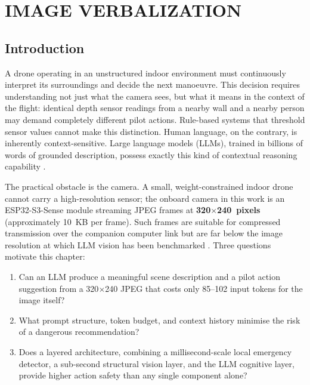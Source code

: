 \chapter{IMAGE VERBALIZATION}
\label{chap:2nd chap}

\section{Introduction}
\label{sec:ch2_intro}

A drone operating in an unstructured indoor environment must continuously interpret its surroundings and decide the next manoeuvre. 
This decision requires understanding not just what the camera
sees, but what it means in the context of the flight: identical depth sensor readings from a nearby wall and a nearby person may demand completely different pilot actions. 
Rule-based systems that threshold sensor values cannot make this distinction. 
Human language, on the contrary, is inherently context-sensitive. Large language models (LLMs), trained in billions of words of grounded description, possess exactly this kind of contextual reasoning capability \cite{vemprala2023chatgpt}.

The practical obstacle is the camera. A small, weight-constrained indoor drone cannot carry a high-resolution sensor; the onboard camera in this work is an ESP32-S3-Sense module streaming JPEG frames at \textbf{320$\times$240~pixels} (approximately 10~KB per frame). 
Such frames are suitable for compressed transmission over the companion computer link but are far below the image resolution at which LLM vision has been benchmarked \cite{achiam2023gpt4,
reid2024gemini, liu2023llava}.
\newpage
Three questions motivate this chapter:
\begin{enumerate}
  \item Can an LLM produce a meaningful scene description and a pilot
        action suggestion from a 320$\times$240 JPEG that costs only 85--102 input tokens for the image itself?
  \item What prompt structure, token budget, and context history minimise the risk of a dangerous recommendation?
  \item Does a layered architecture, combining a millisecond-scale local emergency detector, a sub-second structural vision layer, and the LLM cognitive layer, provide higher action safety than any single component alone?
\end{enumerate}

